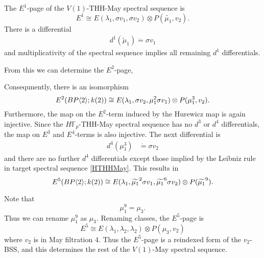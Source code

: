 \begin{cor}
	The $E^1$-page of the $V(1)$-THH-May spectral sequence is 
	\[
	E^1\cong E(\lambda_1, \sigma v_1, \sigma v_2)\otimes P(\widetilde{\mu_1},v_2).
	\]
	There is a differential
	\begin{align*}
		d^1(\widetilde{\mu}_1)\dot{=}\sigma v_1
	\end{align*}
	and multiplicativity of the spectral sequence implies all remaining $d^1$ differentials.
\end{cor}

From this we can determine the $E^2$-page,

\begin{cor}
	Consequnently, there is an isomorphism
	\[
	E^2(BP\langle 2 \rangle;k(2))\cong E(\lambda_1, \sigma v_2, \mu_1^2\sigma v_1)\otimes P(\mu_1^3, v_2).
	\]
	Furthermore, the map on the $E^2$-term induced by the Hurewicz map is again injective. Since the $H\mathbb{F}_p$-THH-May spectral sequence has no $d^3$ or $d^4$ differentials, the map on $E^3$ and $E^4$-terms is also injective. The next differential is
	\begin{align*}
		d^4(\mu_1^3) &\dot{=} \sigma v_2
	\end{align*}
	and there are no further $d^4$ differentials except those implied by the Leibniz rule in target spectral sequence \ref{HTHHMay}.
	This results in 
	\[
	E^5(BP\langle 2 \rangle;k(2))\cong E(\lambda_1, \widetilde{\mu_1}^2\sigma v_1, \widetilde{\mu_1}^6\sigma v_2)\otimes P(\widetilde{\mu_1}^9).
	\]
\end{cor}

Note that 
\[
\mu_1^9 = \mu_3.
\]
Thus we can rename $\mu_1^9$ as $\mu_3$. Renaming classes, the $E^5$-page is 
\[
E^5\cong E(\lambda_1, \lambda_2, \lambda_2)\otimes P(\mu_3,v_2)
\]
where $v_2$ is in May filtration 4. Thus the $E^5$-page is a reindexed form of the $v_2$-BSS, and this determines the rest of the $V(1)$-May spectral sequence.

